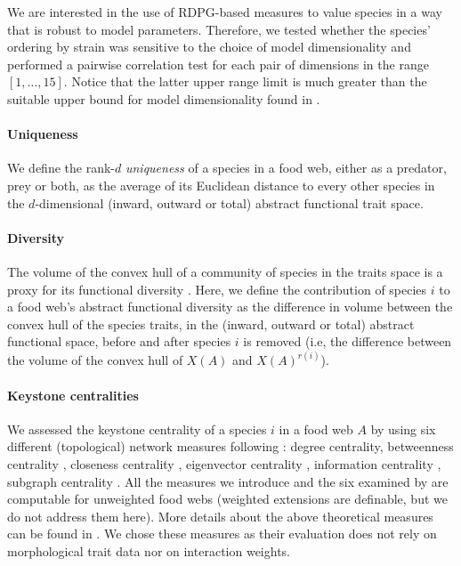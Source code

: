 \documentclass[12pt]{article}
\begin{document}
We are interested in the use of RDPG-based measures to value species in a way that
is robust to model parameters. Therefore, we tested whether the species' ordering by strain
was sensitive to the choice of model dimensionality and performed a pairwise correlation test for each pair of
dimensions in the range $\left[1, \dots, 15 \right]$. Notice that the latter upper
range limit is much greater than the suitable upper bound for model dimensionality found
in \citet{dallariva2015exploring}.

\paragraph{Uniqueness}
We define the rank-$d$ \emph{uniqueness} of a species in a food web, either as
a predator, prey or both, as the average of its
Euclidean distance to every other species in the $d$-dimensional (inward, outward or total)
abstract functional trait space.

\paragraph{Diversity}
The volume of the convex hull of a community of species in the traits space is a
proxy for its functional diversity \citep{villeger2008new}. Here, we define the
contribution of species $i$ to a food web's abstract functional diversity as
the difference in volume between the convex hull of the species traits, in the
(inward, outward or total) abstract functional space, before and after species $i$ is removed (i.e, the
difference between the volume of the convex hull of $X(A)$ and $X(A)^{r(i)}$).

\paragraph{Keystone centralities} We assessed the keystone centrality of a
species $i$ in a food web $A$ by using six different (topological) network measures following
\citet{estrada2007characterization}: degree centrality, betweenness centrality \citep{brandes2001faster},
closeness centrality  \citep{freeman1979centrality}, eigenvector centrality
\citep{bonacich2001eigenvector}, information centrality
\citep{stephenson1989rethinking}, subgraph centrality
\citep{estrada2005subgraph}. All the measures we introduce and the six examined by \citet{estrada2007characterization}
are computable for unweighted food webs (weighted extensions are definable, but we do not address
them here). More details about the above theoretical measures
can be found in \citep{jordan2009trophic}. We chose these measures as their evaluation does
not rely on morphological trait data nor on interaction weights.
\end{document}
